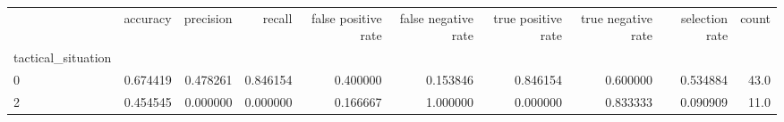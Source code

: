 \begin{tabular}{lrrrrrrrrr}
\toprule
{} &  accuracy &  precision &    recall &  false positive rate &  false negative rate &  true positive rate &  true negative rate &  selection rate &  count \\
tactical\_situation &           &            &           &                      &                      &                     &                     &                 &        \\
\midrule
0                  &  0.674419 &   0.478261 &  0.846154 &             0.400000 &             0.153846 &            0.846154 &            0.600000 &        0.534884 &   43.0 \\
2                  &  0.454545 &   0.000000 &  0.000000 &             0.166667 &             1.000000 &            0.000000 &            0.833333 &        0.090909 &   11.0 \\
\bottomrule
\end{tabular}

